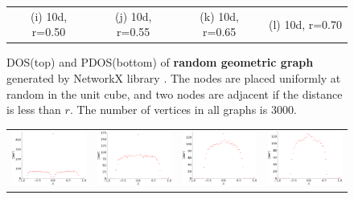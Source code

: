 \documentclass[senior,final,11pt]{iscs-thesis}
\begin{document}
\begin{figure}[htbp]
\begin{tabular}{cccc}
    (i) 10d, r=0.50 & (j) 10d, r=0.55& (k) 10d, r=0.65 & (l) 10d, r=0.70\\ [6pt]
  \end{tabular}
  \caption{DOS(top) and PDOS(bottom) of {\bf random geometric graph} generated by NetworkX library \cite{SciPyProceedings_11}. The nodes are placed uniformly at random in the unit cube, and two nodes are adjacent if the distance is less than $r$. The number of vertices in all graphs is 3000.  }
  \label{fig:random_geometric}
\end{figure}

\begin{figure}[htbp]
  \setlength\tabcolsep{0pt}
  \hspace{-3.0cm}
  \begin{tabular}{cccc}
    \includegraphics[width=45mm]{figure/barabasi_albert_graph_n3000_m2txt_dos.png} &
    \includegraphics[width=45mm]{figure/barabasi_albert_graph_n3000_m3txt_dos.png} &
    \includegraphics[width=45mm]{figure/barabasi_albert_graph_n3000_m4txt_dos.png} &
    \includegraphics[width=45mm]{figure/barabasi_albert_graph_n3000_m5txt_dos.png} \\

\end{tabular}
\end{figure}
\end{document}
